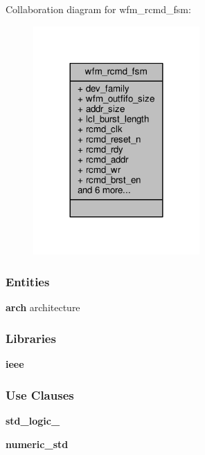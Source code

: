 Collaboration diagram for wfm\+\_\+rcmd\+\_\+fsm\+:\nopagebreak
\begin{figure}[H]
\begin{center}
\leavevmode
\includegraphics[width=180pt]{d4/d57/classwfm__rcmd__fsm__coll__graph}
\end{center}
\end{figure}
\subsubsection*{Entities}
\begin{DoxyCompactItemize}
\item 
{\bf arch} architecture
\end{DoxyCompactItemize}
\subsubsection*{Libraries}
 \begin{DoxyCompactItemize}
\item 
{\bf ieee} 
\end{DoxyCompactItemize}
\subsubsection*{Use Clauses}
 \begin{DoxyCompactItemize}
\item 
{\bf std\+\_\+logic\+\_}   
\item 
{\bf numeric\+\_\+std}   
\end{DoxyCompactItemize}
